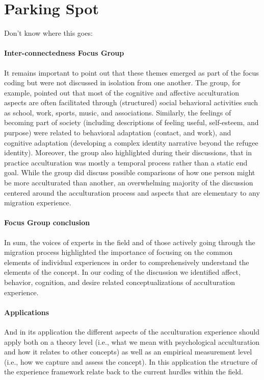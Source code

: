 \documentclass[man, 12pt, a4paper]{apa7}
\begin{document}
\newpage
\section{Parking Spot}
Don't know where this goes:

\paragraph{Inter-connectedness Focus Group}
It remains important to point out that these themes emerged as part of the focus coding but were not discussed in isolation from one another. The group, for example, pointed out that most of the cognitive and affective acculturation aspects are often facilitated through (structured) social behavioral activities such as school, work, sports, music, and associations. Similarly, the feelings of becoming part of society (including descriptions of feeling useful, self-esteem, and purpose) were related to behavioral adaptation (contact, and work), and cognitive adaptation (developing a complex identity narrative beyond the refugee identity). Moreover, the group also highlighted during their discussions, that in practice acculturation was mostly a temporal process rather than a static end goal. While the group did discuss possible comparisons of how one person might be more acculturated than another, an overwhelming majority of the discussion centered around the acculturation process and aspects that are elementary to any migration experience. 

\paragraph{Focus Group conclusion}
In sum, the voices of experts in the field and of those actively going through the migration process highlighted the importance of focusing on the common elements of individual experiences in order to comprehensively understand the elements of the concept. In our coding of the discussion we identified affect, behavior, cognition, and desire related conceptualizations of acculturation experience.

\paragraph{Applications}
And in its application the different aspects of the acculturation experience should apply both on a theory level (i.e., what we mean with psychological acculturation and how it relates to other concepts) as well as an empirical measurement level (i.e., how we capture and assess the concept). In this application the structure of the experience framework relate back to the current hurdles within the field.
\end{document}
